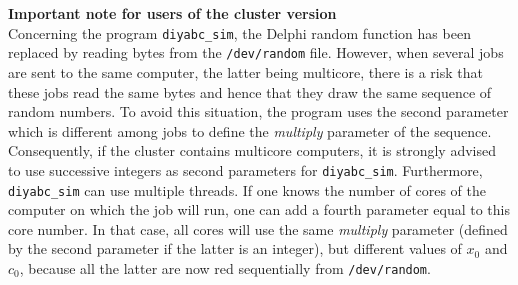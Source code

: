 \textbf{Important note for users of the cluster version}\\
Concerning the program \texttt{diyabc\_sim}, the Delphi \textsf{random} function has been replaced by reading bytes from the \texttt{/dev/random} file. However, when several jobs are sent to the same computer, the latter being multicore, there is a risk that these jobs read the same bytes and hence that they draw the same sequence of random numbers. To avoid this situation, the program uses the second parameter which is different among jobs to define the \emph{multiply} parameter of the sequence. Consequently, if the cluster contains multicore computers, it is strongly advised to use successive integers as second parameters for  \texttt{diyabc\_sim}. Furthermore, \texttt{diyabc\_sim} can use multiple threads. If one knows the number of cores of the computer on which the job will run, one can  add a fourth parameter equal to this core number. In that case, all cores will use the same \emph{multiply} parameter (defined by the second parameter if the latter is an integer), but different values of $x_0$ and $c_0$, because all the latter are now red sequentially from \texttt{/dev/random}.
 


  